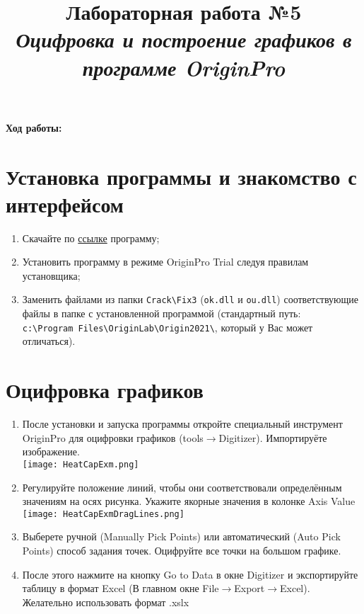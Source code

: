 \documentclass[14pt,a4paper]{article}
\title{Лабораторная работа №5 \\ \textit{Оцифровка и построение графиков в программе OriginPro}}
\begin{document}
\maketitle

\begin{center}
    \textbf{Ход работы:}
\end{center}
\section{Установка программы и знакомство с интерфейсом}
\begin{enumerate}
    \item Скачайте по \href{https://mega.nz/folder/4R9xHYgT#LjgmYjooWK4WEsR4ylHn_w}{ссылке} программу;
    \item Установить программу в режиме OriginPro Trial следуя правилам установщика; 
    \item Заменить файлами из папки \verb=Crack\Fix3= (\verb=ok.dll= и \verb=ou.dll=) соответствующие файлы в папке с установленной программой (стандартный путь: \\ \verb=c:\Program Files\OriginLab\Origin2021\=, который у Вас может отличаться).
\end{enumerate}
\section{Оцифровка графиков}
\begin{enumerate}
    \item После установки и запуска программы откройте специальный инструмент OriginPro для оцифровки графиков (tools$\rightarrow$Digitizer). Импортируёте изображение. \\
    \texttt{[image: HeatCapExm.png]} 
    \item Регулируйте положение линий, чтобы они соответствовали определённым значениям на осях рисунка. Укажите якорные значения в колонке Axis Value \\
    \texttt{[image: HeatCapExmDragLines.png]} 
    \item Выберете ручной (Manually Pick Points) или автоматический (Auto Pick Points) способ задания точек. Оцифруйте все точки на большом графике.
    \item После этого нажмите на кнопку Go to Data в окне Digitizer и экспортируйте таблицу в формат Excel (В главном окне File$\rightarrow$Export$\rightarrow$Excel). Желательно использовать формат .xslx
\end{enumerate}   
\end{document}
